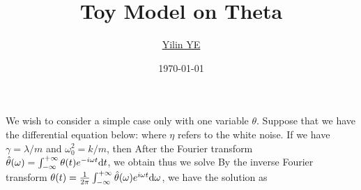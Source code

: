 \documentclass[article,12pt]{elegantpaper}
\title{Toy Model on Theta}
\author{\href{https://yiliny.github.io/yiliny/}{{Yilin YE}}}
\date{\today} %
\begin{document}
\maketitle



We wish to consider a simple case only with one variable $\theta$. Suppose that we have the differential equation below:
where $\eta$ refers to the white noise. If we have $\gamma = \lambda / m$ and $\omega_0^2 = k/m$, then
After the Fourier transform $\hat\theta(\omega) = \int_{-\infty}^{+\infty} \theta(t) e^{-i\omega t} \mathrm{d} t$, we obtain
thus we solve
By the inverse Fourier transform $\theta(t)= \frac{1}{2\pi} \int_{-\infty}^{+\infty} \hat\theta(\omega) e^{i\omega t} \mathrm{d}\omega$, we have the solution as
\end{document}

